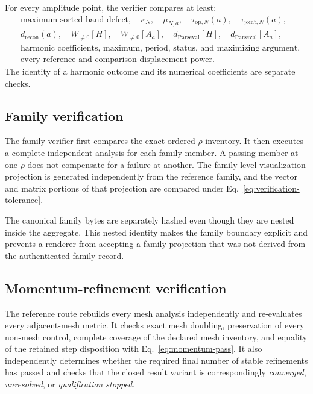For every amplitude point, the verifier compares at least:
\begin{align*}
 &\text{maximum sorted-band defect},\quad
 \kappa_N,\quad \mu_{N,a},\quad
 \tau_{\mathrm{op},N}(a),\quad
 \tau_{\mathrm{joint},N}(a),\\
 &d_{\mathrm{recon}}(a),\quad
 W_{\ne0}[H],\quad W_{\ne0}[A_a],\quad
 d_{\mathrm{Parseval}}[H],\quad d_{\mathrm{Parseval}}[A_a],\\
 &\text{harmonic coefficients, maximum, period, status, and maximizing argument},\\
 &\text{every reference and comparison displacement power}.
\end{align*}
The identity of a harmonic outcome and its numerical coefficients are separate checks.

\subsection{Family verification}

The family verifier first compares the exact ordered $\rho$ inventory.  It then executes
a complete independent analysis for each family member.  A passing member at one $\rho$
does not compensate for a failure at another.  The family-level visualization projection
is generated independently from the reference family, and the vector and matrix portions
of that projection are compared under Eq.~\eqref{eq:verification-tolerance}.

The canonical family bytes are separately hashed even though they are nested inside the
aggregate.  This nested identity makes the family boundary explicit and prevents a
renderer from accepting a family projection that was not derived from the authenticated
family record.

\subsection{Momentum-refinement verification}

The reference route rebuilds every mesh analysis independently and re-evaluates every
adjacent-mesh metric.  It checks exact mesh doubling, preservation of every non-mesh
control, complete coverage of the declared mesh inventory, and equality of the retained
step disposition with Eq.~\eqref{eq:momentum-pass}.  It also independently determines
whether the required final number of stable refinements has passed and checks that the
closed result variant is correspondingly \emph{converged}, \emph{unresolved}, or
\emph{qualification stopped}.

